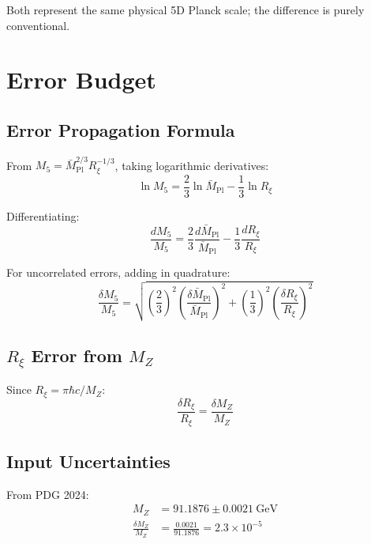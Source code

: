 \documentclass[11pt,a4paper]{article}
\newcommand{\Rxi}{R_\xi}
\newcommand{\Mplbar}{\bar{M}_{\mathrm{Pl}}}
\newcommand{\Mfive}{M_5}
\newcommand{\MZ}{M_Z}
\begin{document}
Both represent the same physical 5D Planck scale; the difference is purely conventional.

\section{Error Budget}

\subsection{Error Propagation Formula}

From $\Mfive = \Mplbar^{2/3} \Rxi^{-1/3}$, taking logarithmic derivatives:
\begin{equation}
\ln \Mfive = \frac{2}{3}\ln \Mplbar - \frac{1}{3}\ln \Rxi
\label{eq:log-M5}
\end{equation}

Differentiating:
\begin{equation}
\frac{d\Mfive}{\Mfive} = \frac{2}{3}\frac{d\Mplbar}{\Mplbar} - \frac{1}{3}\frac{d\Rxi}{\Rxi}
\label{eq:differential-M5}
\end{equation}

For uncorrelated errors, adding in quadrature:
\begin{equation}
\boxed{\frac{\delta\Mfive}{\Mfive} = \sqrt{\left(\frac{2}{3}\right)^2
\left(\frac{\delta\Mplbar}{\Mplbar}\right)^2 + \left(\frac{1}{3}\right)^2
\left(\frac{\delta\Rxi}{\Rxi}\right)^2}}
\label{eq:error-propagation}
\end{equation}

\subsection{$\Rxi$ Error from $\MZ$}

Since $\Rxi = \pi\hbar c/\MZ$:
\begin{equation}
\frac{\delta\Rxi}{\Rxi} = \frac{\delta\MZ}{\MZ}
\label{eq:Rxi-error}
\end{equation}

\subsection{Input Uncertainties}

From PDG 2024:
\begin{align}
\MZ &= 91.1876 \pm 0.0021~\mathrm{GeV} \nonumber\\
\frac{\delta\MZ}{\MZ} &= \frac{0.0021}{91.1876} = 2.3 \times 10^{-5}
\label{eq:MZ-uncertainty}
\end{align}
\end{document}
